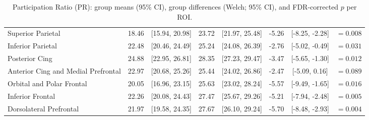 \begin{table}[p]
{\begin{tabular}{lcc|cc|cc|c}
Superior Parietal & 18.46 & [15.94, 20.98] & 23.72 & [21.97, 25.48] & -5.26 & [-8.25, -2.28] & $=0.008$ \\
Inferior Parietal & 22.48 & [20.46, 24.49] & 25.24 & [24.08, 26.39] & -2.76 & [-5.02, -0.49] & $=0.031$ \\
Posterior Cing & 24.88 & [22.95, 26.81] & 28.35 & [27.23, 29.47] & -3.47 & [-5.65, -1.30] & $=0.012$ \\
Anterior Cing and Medial Prefrontal & 22.97 & [20.68, 25.26] & 25.44 & [24.02, 26.86] & -2.47 & [-5.09, 0.16] & $=0.089$ \\
Orbital and Polar Frontal & 20.05 & [16.96, 23.15] & 25.63 & [23.02, 28.24] & -5.57 & [-9.49, -1.65] & $=0.016$ \\
Inferior Frontal & 22.26 & [20.08, 24.43] & 27.47 & [25.67, 29.26] & -5.21 & [-7.94, -2.48] & $=0.005$ \\
Dorsolateral Prefrontal & 21.97 & [19.58, 24.35] & 27.67 & [26.10, 29.24] & -5.70 & [-8.48, -2.93] & $=0.004$ \\
\bottomrule
\end{tabular}
}
\caption{Participation Ratio (PR): group means (95\% CI), group differences (Welch; 95\% CI), and FDR-corrected $p$ per ROI.}
\label{tab:pr_multicolumn}
\end{table}
